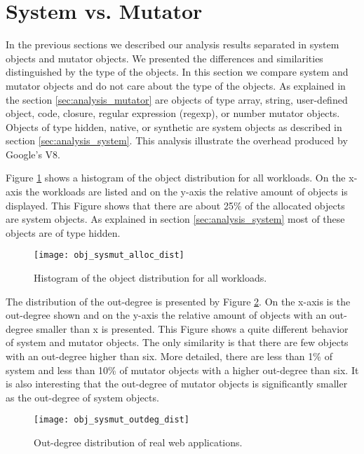 
\section{System vs. Mutator} \label{sec:analysis_sys_vs_mut}

In the previous sections we described our analysis results separated in system objects and mutator objects. We presented the differences and similarities distinguished by the type of the objects. In this section we compare system and mutator objects and do not care about the type of the objects. As explained in the section \ref{sec:analysis_mutator} are objects of type array, string, user-defined object, code, closure, regular expression (regexp), or number mutator objects. Objects of type hidden, native, or synthetic are system objects as described in section \ref{sec:analysis_system}. This analysis illustrate the overhead produced by Google's V8. 

Figure \ref{fig:obj_sysmut_alloc_dist} shows a histogram of the object distribution for all workloads. On the x-axis the workloads are listed and on the y-axis the relative amount of objects is displayed. This Figure shows that there are about 25\% of the allocated objects are system objects. As explained in section \ref{sec:analysis_system} most of these objects are of type hidden. 
\begin{figure}
	\centering
	\texttt{[image: obj\_sysmut\_alloc\_dist]}
	\caption{Histogram of the object distribution for all workloads.}
	\label{fig:obj_sysmut_alloc_dist}
\end{figure}

The distribution of the out-degree is presented by Figure \ref{fig:obj_sysmut_outdeg_dist}. On the x-axis is the out-degree shown and on the y-axis the relative amount of objects with an out-degree smaller than x is presented. This Figure shows a quite different behavior of system and mutator objects. The only similarity is that there are few objects with an out-degree higher than six. More detailed, there are less than 1\% of system and less than 10\% of mutator objects with a higher out-degree than six. It is also interesting that the out-degree of mutator objects is significantly smaller as the out-degree of system objects.
\begin{figure}
	\centering
	\texttt{[image: obj\_sysmut\_outdeg\_dist]}
	\caption{Out-degree distribution of real web applications.}
	\label{fig:obj_sysmut_outdeg_dist}
\end{figure}

